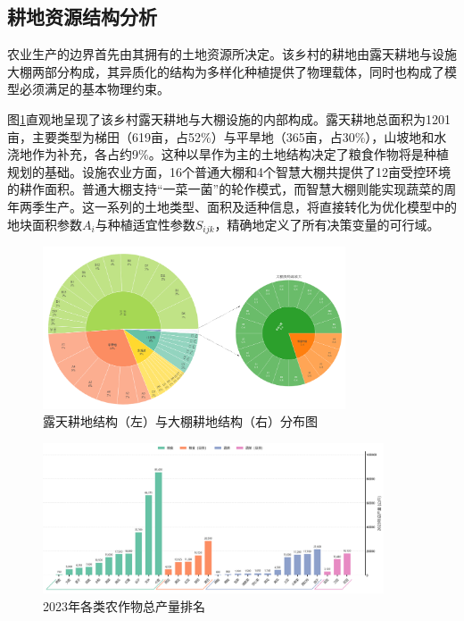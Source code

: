 \documentclass[withoutpreface,bwprint]{cumcmthesis} %
\begin{document}
\subsection{耕地资源结构分析}

农业生产的边界首先由其拥有的土地资源所决定。该乡村的耕地由露天耕地与设施大棚两部分构成，其异质化的结构为多样化种植提供了物理载体，同时也构成了模型必须满足的基本物理约束。

图\ref{fig:land_structure}直观地呈现了该乡村露天耕地与大棚设施的内部构成。露天耕地总面积为1201亩，主要类型为梯田（619亩，占52\%）与平旱地（365亩，占30\%），山坡地和水浇地作为补充，各占约9\%。这种以旱作为主的土地结构决定了粮食作物将是种植规划的基础。设施农业方面，16个普通大棚和4个智慧大棚共提供了12亩受控环境的耕作面积。普通大棚支持“一菜一菌”的轮作模式，而智慧大棚则能实现蔬菜的周年两季生产。这一系列的土地类型、面积及适种信息，将直接转化为优化模型中的地块面积参数$A_i$与种植适宜性参数$S_{ijk}$，精确地定义了所有决策变量的可行域。

\begin{figure}[t]
    \centering
    \includegraphics[width=0.8\textwidth]{figures/0_1.png}
    \caption{露天耕地结构（左）与大棚耕地结构（右）分布图}
    \label{fig:land_structure}
\end{figure}

\begin{figure}[h]
    \centering
    \includegraphics[width=0.9\textwidth]{figures/0_2.png}
    \caption{2023年各类农作物总产量排名}
    \label{fig:production_rank}
\end{figure}
\end{document}
